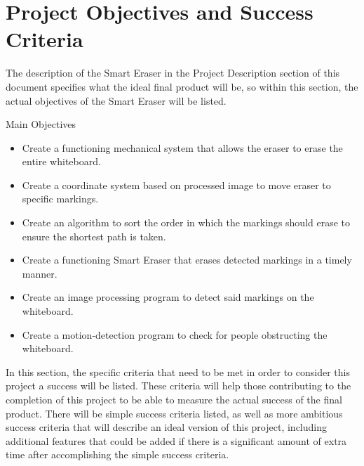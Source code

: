  \section{Project Objectives and Success Criteria}
 The description of the Smart Eraser in the Project Description section of this document specifies what the ideal final product will be, so within this section, the actual objectives of the Smart Eraser will be listed. \\ \par
 \setlength{\parindent}{2.5ex}  Main Objectives
 \begin{itemize}
 \item Create a functioning mechanical system that allows the eraser to erase the entire whiteboard.
 \item Create a coordinate system based on processed image to move eraser to specific markings.
 \item Create an algorithm to sort the order in which the markings should erase to ensure the shortest path is taken.
 \item Create a functioning Smart Eraser that erases detected markings in a timely manner.
 \item Create an image processing program to detect said markings on the whiteboard.
 \item Create a motion-detection program to check for people obstructing the whiteboard. \\
 \end{itemize} \par

\setlength{\parindent}{2.5ex} In this section, the specific criteria that need to be met in order to consider this project a success will be listed. These criteria will help those contributing to the completion of this project to be able to measure the actual success of the final product. There will be simple success criteria listed, as well as more ambitious success criteria that will describe an ideal version of this project, including additional features that could be added if there is a significant amount of extra time after accomplishing the simple success criteria. \\

